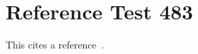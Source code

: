 \documentclass{article}
\begin{document}
\section{Reference Test 483}
This cites a reference~\cite{test483}.

\end{document}
